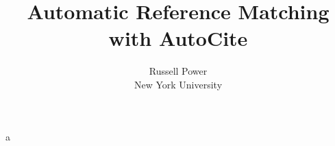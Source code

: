 \documentclass[letterpaper,twocolumn,10pt]{article}
\newcommand{\name}{AutoCite\xspace}
\begin{document}
\date{}a

\title{\sffamily\bfseries Automatic Reference Matching with {\name}}
\author{Russell Power \\ New York University}

 
\maketitle





\begin{footnotesize}


\end{footnotesize}
\end{document}
